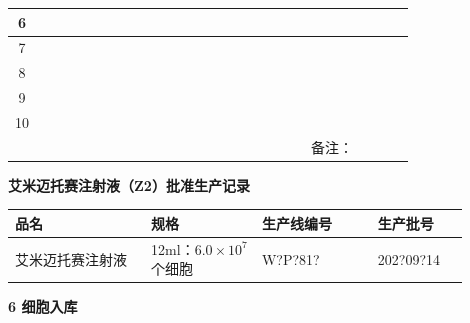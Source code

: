 \documentclass[UTF8,10pt,a4paper,fontset=fandol]{ctexart}
\newcommand{\fieldvalue}[1]{#1}
\newcommand{\handwritten}[1]{#1}
\begin{document}
\begin{center}
\begin{tabular}{|c|p{0.13\linewidth}|p{0.13\linewidth}|p{0.15\linewidth}|p{0.15\linewidth}|p{0.13\linewidth}|p{0.12\linewidth}|p{0.12\linewidth}|}
\hline
6 & & & & & & & \\
\hline
7 & & & & & & & \\
\hline
8 & & & & & & & \\
\hline
9 & & & & & & & \\
\hline
10 & & & & & & & \\
\hline
\multicolumn{7}{|r|}{备注：} &
\fieldvalue{\handwritten{\checkmark}} \\
\hline
\end{tabular}
\end{center}


\newpage

\begin{center}
\textbf{艾米迈托赛注射液（Z2）批准生产记录}
\end{center}

\noindent
\begin{tabular}{|p{0.27\linewidth}|p{0.22\linewidth}|p{0.23\linewidth}|p{0.18\linewidth}|}
\hline
品名 & 规格 & 生产线编号 & 生产批号\\
\hline
艾米迈托赛注射液 & 12ml：$6.0\times 10^{7}$个细胞 &
\fieldvalue{\handwritten{W?P?81?}} &
\fieldvalue{\handwritten{202?09?14}}\\
\hline
\end{tabular}

\vspace{0.5em}

\noindent\textbf{6 细胞入库}
\end{document}
